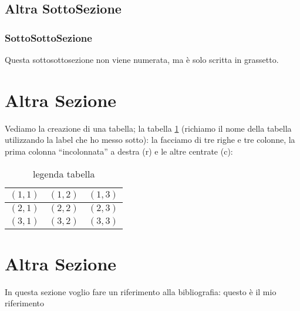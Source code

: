 \documentclass[12pt,a4paper,openright,twoside]{report}
\begin{document}
\subsection{Altra SottoSezione}

\subsubsection{SottoSottoSezione}Questa sottosottosezione non viene
numerata, ma \`e solo scritta in grassetto.


\section{Altra Sezione} %
Vediamo la creazione di una tabella; la tabella \ref{tab:uno}
(richiamo il nome della tabella utilizzando la label che ho messo sotto):
la facciamo di tre righe e tre colonne, la prima colonna
``incolonnata'' a destra (r) e le altre centrate (c):\\
\begin{table}[h] %
\begin{center} %
\begin{tabular}{r|c|c} %
\hline \hline                           %
$(1,1)$ & $(1,2)$ & $(1,3)$\\ %
\hline                                  %
$(2,1)$ & $(2,2)$ & $(2,3)$\\ %
\hline                                  %
$(3,1)$ & $(3,2)$ & $(3,3)$\\
\hline \hline                           %
\end{tabular}
\caption[legenda elenco tabelle]{legenda tabella}\label{tab:uno}
\end{center}
\end{table}


\section{Altra Sezione}\label{sec:prova}%
In questa sezione voglio fare un riferimento alla bibliografia: questo \`e il mio riferimento %
\end{document}
